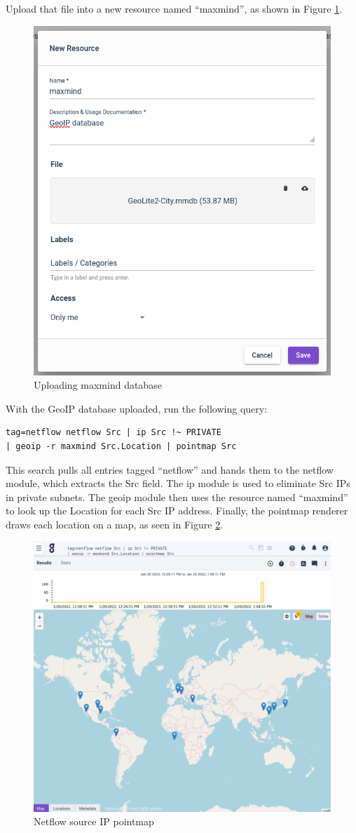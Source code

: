 Upload that file into a new resource named ``maxmind'', as shown in Figure \ref{fig:maxmind-upload}.

\begin{figure}
	\includegraphics[width=0.5\linewidth]{images/maxmind-upload.png}
	\caption{Uploading maxmind database}
	\label{fig:maxmind-upload}
\end{figure}

With the GeoIP database uploaded, run the following query:

\begin{Verbatim}[breaklines=true]
tag=netflow netflow Src | ip Src !~ PRIVATE
| geoip -r maxmind Src.Location | pointmap Src
\end{Verbatim}

This search pulls all entries tagged ``netflow'' and hands them to the
netflow module, which extracts the Src field. The ip module is used to
eliminate Src IPs in private subnets. The geoip module then uses the
resource named ``maxmind'' to look up the Location for each Src IP
address. Finally, the pointmap renderer draws each location on a map, as
seen in Figure \ref{fig:maxmind-pointmap}.

\begin{figure}
	\includegraphics[width=0.7\linewidth]{images/maxmind-pointmap.png}
	\caption{Netflow source IP pointmap}
	\label{fig:maxmind-pointmap}
\end{figure}

